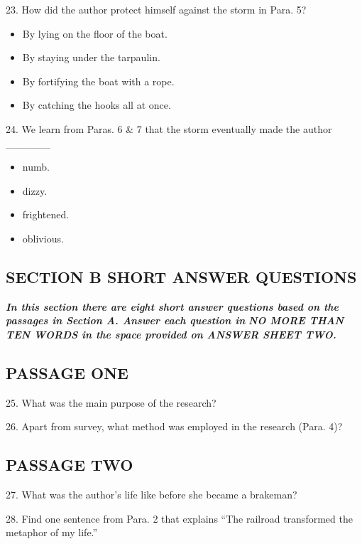 \documentclass[UTF8,11pt]{ctexart}
\begin{document}
23. How did the author protect himself against the storm in Para. 5?


\begin{itemize}[leftmargin=2em,itemsep=.2em,topsep=.4em]\item[A.] By lying on the floor of the boat.
\item[B.] By staying under the tarpaulin.
\item[C.] By fortifying the boat with a rope.
\item[D.] By catching the hooks all at once.
\end{itemize}

24. We learn from Paras. 6 \& 7 that the storm eventually made the author \_\_\_\_\_\_


\begin{itemize}[leftmargin=2em,itemsep=.2em,topsep=.4em]\item[A.] numb.
\item[B.] dizzy.
\item[C.] frightened.
\item[D.] oblivious.
\end{itemize}

\subsection*{\textbf{SECTION B SHORT ANSWER QUESTIONS}}


\textbf{\textit{In this section there are eight short answer questions based on the passages in Section A. Answer each question in}} \textbf{\textit{NO MORE THAN TEN WORDS in the space provided on ANSWER SHEET TWO.}}


\subsection*{\textbf{PASSAGE ONE}}


25. What was the main purpose of the research?


26. Apart from survey, what method was employed in the research (Para. 4)?


\subsection*{\textbf{PASSAGE TWO}}


27. What was the author’s life like before she became a brakeman?


28. Find one sentence from Para. 2 that explains “The railroad transformed the metaphor of my life.”
\end{document}
